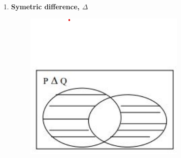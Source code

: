 \documentclass[12pt]{report}
\begin{document}
\begin{enumerate}
\begin{figure}[h!]
            \end{figure}
        \item \textbf{Symetric difference, $\Delta$} \\
                \begin{figure}[h!]
                    \includegraphics[width=0.4\linewidth]{symmetric_diff.png}
                \end{figure}
    \end{enumerate}
\end{document}

